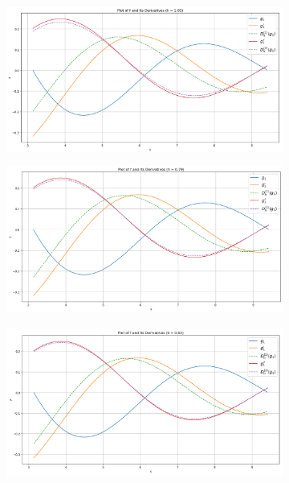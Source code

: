 \begin{figure}[h!]
    \centering
    \begin{subfigure}[b]{0.49\linewidth}
        \includegraphics[width=\linewidth]{graphics/plot_h/exp1_huge_h.png}
    \end{subfigure}
    \begin{subfigure}[b]{0.49\linewidth}
        \includegraphics[width=\linewidth]{graphics/plot_h/exp1_large_h.png}
    \end{subfigure}
    \begin{subfigure}[b]{0.49\linewidth}
        \includegraphics[width=\linewidth]{graphics/plot_h/exp1_small_h.png}

\end{subfigure}
\end{figure}
